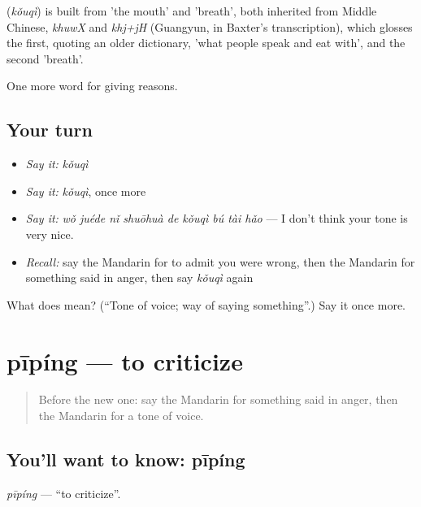 \begin{cousinweb}
\textbf{} (\emph{kǒuqì}) is built from  'the mouth' and  'breath', both inherited from Middle Chinese, \emph{khuwX} and \emph{khj+jH} (Guangyun, in Baxter's transcription), which glosses the first, quoting an older dictionary, 'what people speak and eat with', and the second 'breath'.
\end{cousinweb}

\begin{grammarlens}[title={What you've built}]
One more word for giving reasons.
\end{grammarlens}

\subsection*{Your turn}
\begin{itemize}
\raggedright
  \item \emph{Say it:} \emph{kǒuqì}
  \item \emph{Say it:} \emph{kǒuqì}, once more
  \item \emph{Say it:} \emph{wǒ juéde nǐ shuōhuà de kǒuqì bú tài hǎo} — I don't think your tone is very nice.
  \item \emph{Recall:} say the Mandarin for to admit you were wrong, then the Mandarin for something said in anger, then say \emph{kǒuqì} again
\end{itemize}

\begin{tcolorbox}[breakable,colback=teal!4,colframe=teal!35!black,title={Before you move on}]
What does  mean? (\textquotedblleft{}Tone of voice; way of saying something\textquotedblright{}.) Say it once more.
\end{tcolorbox}
\section[pīpíng]{pīpíng — to criticize}

\label{lesson:ZH-C357-piping}



\begin{quote}
Before the new one: say the Mandarin for something said in anger, then the Mandarin for a tone of voice.
\end{quote}

\subsection*{You'll want to know: pīpíng}
\emph{pīpíng} — \textquotedblleft{}to criticize\textquotedblright{}.

